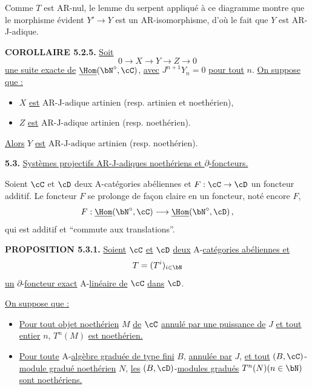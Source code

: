 Comme $T$ est AR-nul, le lemme du serpent appliqu\'e \`a ce diagramme montre que le morphisme \'evident $Y' \rightarrow Y$ est un AR-isomorphisme, d'o\`u le fait que $Y$ est AR-J-adique.

\newpage

\noindent
\textbf{COROLLAIRE 5.2.5.} \underline{Soit}
\[
0 \longrightarrow X \longrightarrow Y \longrightarrow Z \longrightarrow 0
\]
\underline{une suite exacte de} $\underline{\Hom}(\bN^{\circ}, \cC)$, \underline{avec} $J^{n+1}Y_n = 0$ \underline{pour tout} $n$. \underline{On suppose que :}
\begin{itemize}
\item[(i)] $X$ \underline{est} $\mathrm{AR\text{-}J\text{-}adique}$ artinien (resp. artinien et noeth\'erien),
\item[(ii)] $Z$ \underline{est} $\mathrm{AR\text{-}J\text{-}adique}$ artinien (resp. noeth\'erien).
\end{itemize}
\underline{Alors} $Y$ \underline{est} $\mathrm{AR\text{-}J\text{-}adique}$ artinien (resp. noeth\'erien).

\bigskip

\noindent
\textbf{5.3.} \underline{Syst\`emes projectifs AR-J-adiques noeth\'eriens et $\partial$-foncteurs.}

Soient $\cC$ et $\cD$ deux A-cat\'egories ab\'eliennes et $F : \cC \rightarrow \cD$ un foncteur additif. Le foncteur $F$ se prolonge de fa\c con claire en un foncteur, not\'e encore $F$,
\[
F : \underline{\Hom}(\bN^{\circ}, \cC) \longrightarrow \underline{\Hom}(\bN^{\circ}, \cD)\,,
\]
qui est additif et ``commute aux translations''.

\bigskip

\noindent
\textbf{PROPOSITION 5.3.1.} \underline{Soient} $\cC$ \underline{et} $\cD$ \underline{deux} A-\underline{cat\'egories ab\'eliennes et}
\[
T = (T^i)_{i \in \bN}
\]
\underline{un} $\partial$-\underline{foncteur exact} A-\underline{lin\'eaire de} $\cC$ \underline{dans} $\cD$.

\underline{On suppose que :}
\begin{itemize}
\item[(i)] \underline{Pour tout objet noeth\'erien} $M$ \underline{de} $\cC$ \underline{annul\'e par une puissance de} $J$ \underline{et tout entier} $n$, $T^n(M)$ \underline{est noeth\'erien.}
\item[(ii)] \underline{Pour toute} A-\underline{alg\`ebre gradu\'ee de type fini} $B$, \underline{annul\'ee par} $J$, \underline{et tout} $(B,\cC)$-\underline{module gradu\'e noeth\'erien} $N$, \underline{les} $(B,\cD)$-\underline{modules gradu\'es} $T^n(N) (n \in \bN)$ \underline{sont noeth\'eriens.}
\end{itemize}

